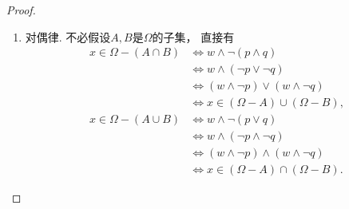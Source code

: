 \begin{property}
\begin{proof}
\begin{enumerate}
            对于\cref{equation:集合论.集合代数公式3-6}，
            任取集合\(Y\)，
            有
            \begin{align*}
                Y\in\Powerset(A\cap B)
                &\iff(\forall y\in Y)[y\in A\land y\in B] \tag{幂集、交集的定义}\\
                &\iff(\forall y\in Y)[y\in A]\land(\forall y\in Y)[y\in B]
                \tag{全称量词与合取}\\
                &\iff(Y\subseteq A)\land(Y\subseteq B) \\
                &\iff Y\in\Powerset A\cap\Powerset B.
            \end{align*}

            最后证明交对对称差的分配律.
            当\(r\)为假时，
            \((p\lxor q)\land r\)与\((p\land r)\lxor(q\land r)\)均为假；当\(r\)为真时，
            两者均化为\(p\lxor q\).
            故
            \begin{align*}
                x\in(A\symdiff B)\cap C
                &\iff(p\lxor q)\land r \\
                &\iff(p\land r)\lxor(q\land r) \tag{按合取因子分类}\\
                &\iff x\in(A\cap C)\symdiff(B\cap C).
            \end{align*}

            \item 对偶律.
            不必假设\(A,B\)是\(\Omega\)的子集，
            直接有
            \begin{align*}
                x\in\Omega-(A\cap B)
                &\iff w\land\neg(p\land q) \\
                &\iff w\land(\neg p\lor\neg q) \tag{德摩根律}\\
                &\iff(w\land\neg p)\lor(w\land\neg q) \tag{合取分配律}\\
                &\iff x\in(\Omega-A)\cup(\Omega-B), \\
                x\in\Omega-(A\cup B)
                &\iff w\land\neg(p\lor q) \\
                &\iff w\land(\neg p\land\neg q) \tag{德摩根律}\\
                &\iff(w\land\neg p)\land(w\land\neg q) \tag{结合律、幂等律}\\
                &\iff x\in(\Omega-A)\cap(\Omega-B).
            \end{align*}


\end{enumerate}
\end{proof}
\end{property}
